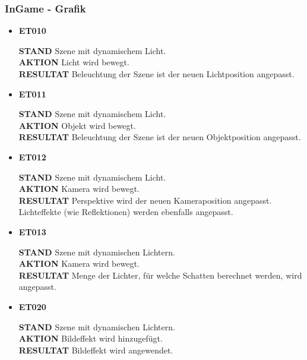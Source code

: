 \documentclass[parskip=full]{scrartcl}
\begin{document}
	\subsubsection{InGame - Grafik}
	\begin{itemize} [label={}]
		\item \textbf{ET010}\par
			\textbf{STAND} Szene mit dynamischem Licht.\\
			\textbf{AKTION} Licht wird bewegt.\\
			\textbf{RESULTAT} Beleuchtung der Szene ist der neuen Lichtposition angepasst.\\\par
		
		\item \textbf{ET011}\par
			\textbf{STAND} Szene mit dynamischem Licht.\\ 
			\textbf{AKTION} Objekt wird bewegt.\\
			\textbf{RESULTAT} Beleuchtung der Szene ist der neuen Objektposition angepasst.\\\par

		\item \textbf{ET012}\par
			\textbf{STAND} Szene mit dynamischem Licht.\\
			\textbf{AKTION} Kamera wird bewegt.\\
			\textbf{RESULTAT} Perspektive wird der neuen Kameraposition angepasst. Lichteffekte (wie Reflektionen) werden ebenfalls angepasst.\\\par
		
		\item \textbf{ET013}\par
			\textbf{STAND} Szene mit dynamischen Lichtern.\\
			\textbf{AKTION} Kamera wird bewegt.\\
			\textbf{RESULTAT} Menge der Lichter, für welche Schatten berechnet werden, wird angepasst.\\\par

		\item \textbf{ET020}\par
			\textbf{STAND} Szene mit dynamischen Lichtern.\\
			\textbf{AKTION} Bildeffekt wird hinzugefügt.\\
			\textbf{RESULTAT} Bildeffekt wird angewendet.\\\par


\end{itemize}
\end{document}
